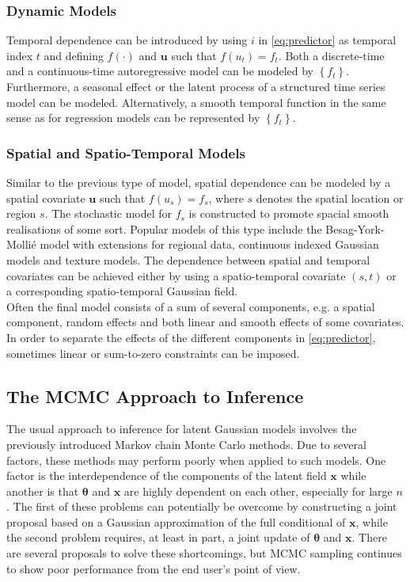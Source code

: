 \subsubsection*{Dynamic Models}
Temporal dependence can be introduced by using $i$ in \eqref{eq:predictor} as temporal index $t$ and defining $f\left(\cdot\right)$ and $\pmb{u}$ such that $f\left(u_t\right)=f_t$. Both a discrete-time and a continuous-time autoregressive model can be modeled by $\left\lbrace f_t\right\rbrace$. Furthermore, a seasonal effect or the latent process of a structured time series model can be modeled. Alternatively, a smooth temporal function in the same sense as for regression models can be represented by $\left\lbrace f_t\right\rbrace$.
\subsubsection*{Spatial and Spatio-Temporal Models}
Similar to the previous type of model, spatial dependence can be modeled by a spatial covariate $\pmb{u}$ such that $f\left(u_s\right)=f_s$, where $s$ denotes the spatial location or region $s$. The stochastic model for $f_s$ is constructed to promote spacial smooth realisations of some sort. Popular models of this type include the Besag-York-Mollié\autocite[Cf.][]{besag1991bayesian} model with extensions for regional data, continuous indexed Gaussian models and texture models. The dependence between spatial and temporal covariates can be achieved either by using a spatio-temporal covariate $(s,t)$ or a corresponding spatio-temporal Gaussian field.\\
Often the final model consists of a sum of several components, e.g. a spatial component, random effects and both linear and smooth effects of some covariates. In order to separate the effects of the different components in \eqref{eq:predictor}, sometimes linear or sum-to-zero constraints can be imposed\autocite[Cf.][]{rue2009approximate}.
\subsection{The MCMC Approach to Inference}
The usual approach to inference for latent Gaussian models involves the previously introduced Markov chain Monte Carlo methods. Due to several factors, these methods may perform poorly when applied to such models. One factor is the interdependence of the components of the latent field $\pmb{x}$ while another is that $\pmb{\theta}$ and $\pmb{x}$ are highly dependent on each other, especially for large $n$. The first of these problems can potentially be overcome by constructing a joint proposal based on a Gaussian approximation of the full conditional of $\pmb{x}$, while the second problem requires, at least in part, a joint update of $\pmb{\theta}$ and $\pmb{x}$. There are several proposals to solve these shortcomings, but MCMC sampling continues to show poor performance from the end user's point of view\autocite[Cf.][]{rue2009approximate}.
